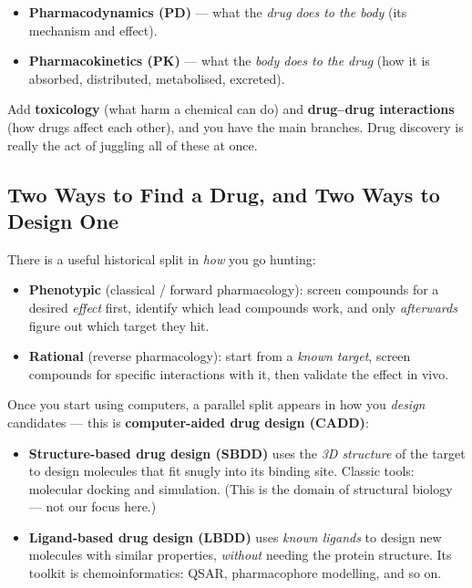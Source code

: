 \documentclass[11pt, oneside]{book}
\begin{document}
\begin{itemize}
  \item \textbf{Pharmacodynamics (PD)} --- what the \emph{drug does to the body}
        (its mechanism and effect).
  \item \textbf{Pharmacokinetics (PK)} --- what the \emph{body does to the drug}
        (how it is absorbed, distributed, metabolised, excreted).
\end{itemize}

\noindent Add \textbf{toxicology} (what harm a chemical can do) and
\textbf{drug--drug interactions} (how drugs affect each other), and you have the
main branches. Drug discovery is really the act of juggling all of these at once.

\subsection{Two Ways to Find a Drug, and Two Ways to Design One}

There is a useful historical split in \emph{how} you go hunting:

\begin{itemize}
  \item \textbf{Phenotypic} (classical / forward pharmacology): screen compounds
        for a desired \emph{effect} first, identify which lead compounds work,
        and only \emph{afterwards} figure out which target they hit.
  \item \textbf{Rational} (reverse pharmacology): start from a \emph{known target},
        screen compounds for specific interactions with it, then validate the
        effect in vivo.
\end{itemize}

Once you start using computers, a parallel split appears in how you \emph{design}
candidates --- this is \textbf{computer-aided drug design (CADD)}:

\begin{itemize}
  \item \textbf{Structure-based drug design (SBDD)} uses the \emph{3D structure}
        of the target to design molecules that fit snugly into its binding site.
        Classic tools: molecular docking and simulation. (This is the domain of
        structural biology --- not our focus here.)
  \item \textbf{Ligand-based drug design (LBDD)} uses \emph{known ligands} to
        design new molecules with similar properties, \emph{without} needing the
        protein structure. Its toolkit is chemoinformatics: QSAR, pharmacophore
        modelling, and so on.
\end{itemize}
\end{document}
